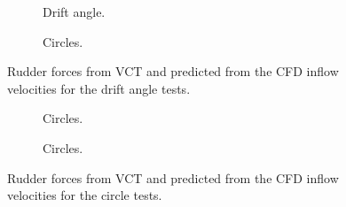 \begin{figure}[h]
     \centering
     \begin{subfigure}[b]{\textwidth}
         \centering
         
        \caption{Drift angle.}
        \label{fig:ID_wPCC_10}
     \end{subfigure}
     \vfill
     \begin{subfigure}[b]{\textwidth}
         
        \caption{Circles.}
        \label{fig:ID_wPCC_20}
     \end{subfigure}
        \caption{Rudder forces from VCT and predicted from the CFD inflow velocities for the drift angle tests.}
        \label{fig:ID_wPCC}
\end{figure}
\begin{figure}[h]
     \centering
     \begin{subfigure}[b]{\textwidth}
         \centering
         
        \caption{Circles.}
        \label{fig:ID_wPCC_10}
     \end{subfigure}
     \vfill
     \begin{subfigure}[b]{\textwidth}
         
        \caption{Circles.}
        \label{fig:ID_wPCC_20}
     \end{subfigure}
        \caption{Rudder forces from VCT and predicted from the CFD inflow velocities for the circle tests.}
        \label{fig:ID_wPCC}
\end{figure}